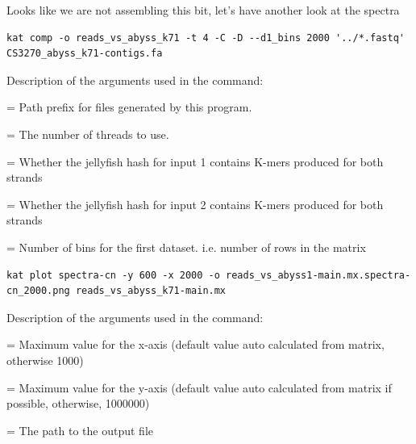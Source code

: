 \begin{steps}
Looks like we are not assembling this bit, let's have another look at the spectra
\begin{lstlisting}
kat comp -o reads_vs_abyss_k71 -t 4 -C -D --d1_bins 2000 '../*.fastq' CS3270_abyss_k71-contigs.fa
\end{lstlisting}
\end{steps}
Description of the arguments used in the command:
\begin{description}[style=multiline,labelindent=0cm,align=right,leftmargin=\descriptionlabelspace,rightmargin=1.5cm,font=\ttfamily]
  \item[o] = Path prefix for files generated by this program.
  \item[t] = The number of threads to use.  
  \item[C] = Whether the jellyfish hash for input 1 contains K-mers produced for both strands
  \item[D] = Whether the jellyfish hash for input 2 contains K-mers produced for both strands
  \item[--d1_bins] = Number of bins for the first dataset. i.e. number of rows in the matrix
\end{description}

\begin{steps}
\begin{lstlisting}
kat plot spectra-cn -y 600 -x 2000 -o reads_vs_abyss1-main.mx.spectra-cn_2000.png reads_vs_abyss_k71-main.mx
\end{lstlisting}
\end{steps}
Description of the arguments used in the command:
\begin{description}[style=multiline,labelindent=0cm,align=right,leftmargin=\descriptionlabelspace,rightmargin=1.5cm,font=\ttfamily]
  \item[x] = Maximum value for the x-axis (default value auto calculated from matrix, otherwise 1000)
  \item[y] = Maximum value for the y-axis (default value auto calculated from matrix if possible, otherwise, 1000000)
  \item[o] = The path to the output file
\end{description}



